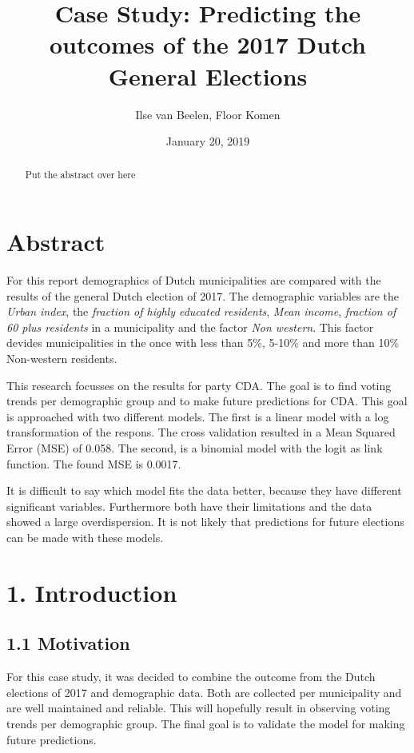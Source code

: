 \documentclass[11pt,]{article}
\title{Case Study: Predicting the outcomes of the 2017 Dutch General Elections}
\author{Ilse van Beelen, Floor Komen}
\date{January 20, 2019}
\begin{document}
\maketitle
\begin{abstract}
Put the abstract over here
\end{abstract}

\section{Abstract}\label{abstract}

For this report demographics of Dutch municipalities are compared with
the results of the general Dutch election of 2017. The demographic
variables are the \emph{Urban index}, the \emph{fraction of highly
educated residents}, \emph{Mean income}, \emph{fraction of 60 plus
residents} in a municipality and the factor \emph{Non western}. This
factor devides municipalities in the once with less than 5\%, 5-10\% and
more than 10\% Non-western residents.

This research focusses on the results for party CDA. The goal is to find
voting trends per demographic group and to make future predictions for
CDA. This goal is approached with two different models. The first is a
linear model with a log transformation of the respons. The cross
validation resulted in a Mean Squared Error (MSE) of 0.058. The second,
is a binomial model with the logit as link function. The found MSE is
0.0017.

It is difficult to say which model fits the data better, because they
have different significant variables. Furthermore both have their
limitations and the data showed a large overdispersion. It is not likely
that predictions for future elections can be made with these models.

\section{1. Introduction}\label{introduction}

\subsection{1.1 Motivation}\label{motivation}

For this case study, it was decided to combine the outcome from the
Dutch elections of 2017 and demographic data. Both are collected per
municipality and are well maintained and reliable. This will hopefully
result in observing voting trends per demographic group. The final goal
is to validate the model for making future predictions.
\end{document}
